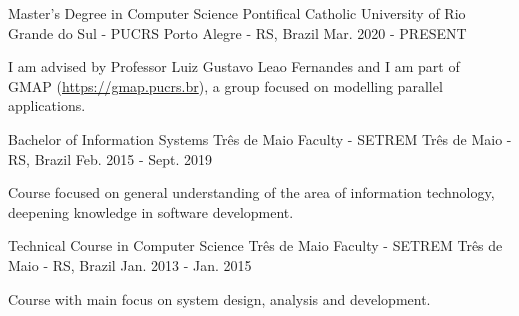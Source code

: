 
\begin{cventries}
  \cventry
  {Master's Degree in Computer Science} %
  {Pontifical Catholic University of Rio Grande do Sul - PUCRS} %
  {Porto Alegre - RS, Brazil} %
  {Mar. 2020 - PRESENT} %
  {
    \begin{cvitems} %
      \item {I am advised by Professor Luiz Gustavo Leao Fernandes and I am part of\\GMAP (\href{https://gmap.pucrs.br}{https://gmap.pucrs.br}), a group focused on modelling parallel applications.}
    \end{cvitems}
  }

  \cventry
  {Bachelor of Information Systems} %
  {Três de Maio Faculty - SETREM} %
  {Três de Maio - RS, Brazil} %
  {Feb. 2015 - Sept. 2019} %
  {
    \begin{cvitems} %
      \item {Course focused on general understanding of the area of information technology,\\deepening knowledge in software development.}
    \end{cvitems}
  }

  \cventry
  {Technical Course in Computer Science} %
  {Três de Maio Faculty - SETREM} %
  {Três de Maio - RS, Brazil} %
  {Jan. 2013 - Jan. 2015} %
  {
    \begin{cvitems} %
      \item {Course with main focus on system design, analysis and development.}
    \end{cvitems}
  }
\end{cventries}
